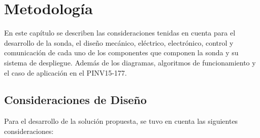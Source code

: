\chapter[Metodolog\'ia.]{Metodología}
\pagestyle{fancy}
En este cap\'itulo se describen las consideraciones tenidas en cuenta para el desarrollo de la sonda, el diseño mec\'anico, el\'ectrico, electr\'onico, control y comunicaci\'on de cada uno de los componentes que componen la sonda y su sistema de despliegue. Adem\'as de los diagramas, algoritmos de funcionamiento y el caso de aplicaci\'on en el PINV15-177.

\section[Consideraciones del sistema]{Consideraciones de Dise\~no}
Para el desarrollo de la soluci\'on propuesta, se tuvo en cuenta las siguientes consideraciones:
